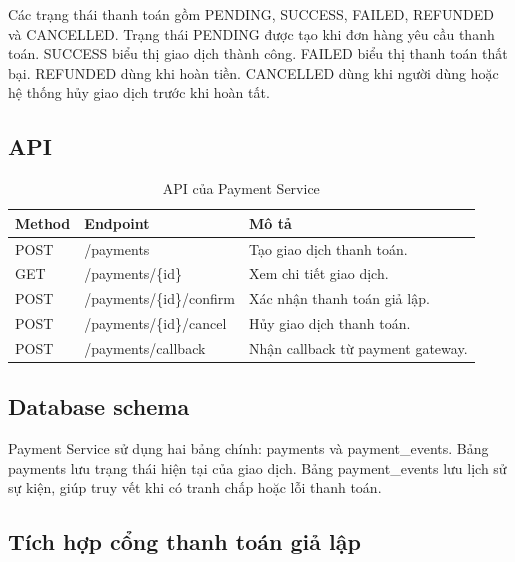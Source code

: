 \documentclass[../main.tex]{subfiles}
\begin{document}
Các trạng thái thanh toán gồm PENDING, SUCCESS, FAILED, REFUNDED và CANCELLED. Trạng thái PENDING được tạo khi đơn hàng yêu cầu thanh toán. SUCCESS biểu thị giao dịch thành công. FAILED biểu thị thanh toán thất bại. REFUNDED dùng khi hoàn tiền. CANCELLED dùng khi người dùng hoặc hệ thống hủy giao dịch trước khi hoàn tất.

\subsection{API}
\label{subsection:2.7.3}

\begin{table}[H]
    \centering
    \caption{API của Payment Service}
    \label{tab:chapter2-payment-api}
    \begin{tabular}{|p{}|p{}|p{}|}
        \hline
        \rowcolor{primary!35}
        \textbf{Method} & \textbf{Endpoint} & \textbf{Mô tả} \\
        \hline
        POST & /payments & Tạo giao dịch thanh toán. \\
        \hline
        GET & /payments/\{id\} & Xem chi tiết giao dịch. \\
        \hline
        POST & /payments/\{id\}/confirm & Xác nhận thanh toán giả lập. \\
        \hline
        POST & /payments/\{id\}/cancel & Hủy giao dịch thanh toán. \\
        \hline
        POST & /payments/callback & Nhận callback từ payment gateway. \\
        \hline
    \end{tabular}
\end{table}

\subsection{Database schema}
\label{subsection:2.7.4}

Payment Service sử dụng hai bảng chính: payments và payment\_events. Bảng payments lưu trạng thái hiện tại của giao dịch. Bảng payment\_events lưu lịch sử sự kiện, giúp truy vết khi có tranh chấp hoặc lỗi thanh toán.

\subsection{Tích hợp cổng thanh toán giả lập}
\label{subsection:2.7.5}
\end{document}

